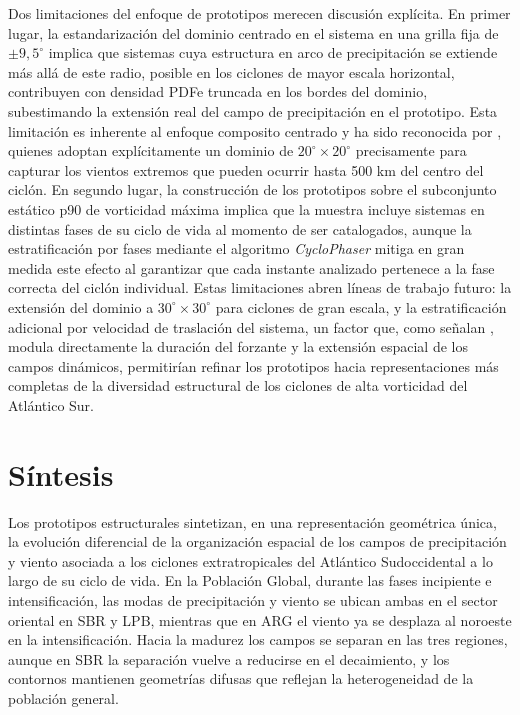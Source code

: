 
Dos limitaciones del enfoque de prototipos merecen discusión explícita. En primer lugar, la estandarización del dominio centrado en el sistema en una grilla fija de $\pm 9{,}5^{\circ}$ implica que sistemas cuya estructura en arco de precipitación se extiende más allá de este radio, posible en los ciclones de mayor escala horizontal, contribuyen con densidad PDFe truncada en los bordes del dominio, subestimando la extensión real del campo de precipitación en el prototipo. Esta limitación es inherente al enfoque composito centrado y ha sido reconocida por \citet{cardoso2022synoptic}, quienes adoptan explícitamente un dominio de $20^{\circ} \times 20^{\circ}$ precisamente para capturar los vientos extremos que pueden ocurrir hasta 500 km del centro del ciclón. En segundo lugar, la construcción de los prototipos sobre el subconjunto estático p90 de vorticidad máxima implica que la muestra incluye sistemas en distintas fases de su ciclo de vida al momento de ser catalogados, aunque la estratificación por fases mediante el algoritmo \textit{CycloPhaser} \citep{deSouza2025CycloPhaser} mitiga en gran medida este efecto al garantizar que cada instante analizado pertenece a la fase correcta del ciclón individual. Estas limitaciones abren líneas de trabajo futuro: la extensión del dominio a $30^{\circ} \times 30^{\circ}$ para ciclones de gran escala, y la estratificación adicional por velocidad de traslación del sistema, un factor que, como señalan \citet{gramcianinov2023impact}, modula directamente la duración del forzante y la extensión espacial de los campos dinámicos, permitirían refinar los prototipos hacia representaciones más completas de la diversidad estructural de los ciclones de alta vorticidad del Atlántico Sur.

\section{Síntesis}\label{sec:sintesis_prototipos}

Los prototipos estructurales sintetizan, en una representación geométrica única, la evolución diferencial de la organización espacial de los campos de precipitación y viento asociada a los ciclones extratropicales del Atlántico Sudoccidental a lo largo de su ciclo de vida. En la Población Global, durante las fases incipiente e intensificación, las modas de precipitación y viento se ubican ambas en el sector oriental en SBR y LPB, mientras que en ARG el viento ya se desplaza al noroeste en la intensificación. Hacia la madurez los campos se separan en las tres regiones, aunque en SBR la separación vuelve a reducirse en el decaimiento, y los contornos mantienen geometrías difusas que reflejan la heterogeneidad de la población general.

